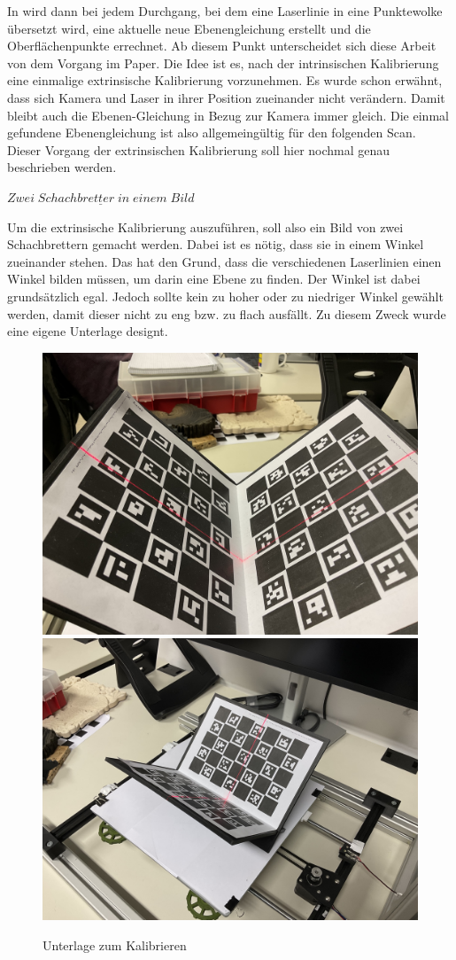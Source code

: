 		In \citep{bajpai_cross-platform_nodate} wird dann bei jedem Durchgang, bei dem eine Laserlinie in eine Punktewolke übersetzt wird, eine aktuelle neue Ebenengleichung erstellt und die Oberflächenpunkte errechnet. Ab diesem Punkt unterscheidet sich diese Arbeit von dem Vorgang im Paper. Die Idee ist es, nach der intrinsischen Kalibrierung eine einmalige extrinsische Kalibrierung vorzunehmen. Es wurde schon erwähnt, dass sich Kamera und Laser in ihrer Position zueinander nicht verändern. Damit bleibt auch die Ebenen-Gleichung in Bezug zur Kamera immer gleich. Die einmal gefundene Ebenengleichung ist also allgemeingültig für den folgenden Scan. Dieser Vorgang der extrinsischen Kalibrierung soll hier nochmal genau beschrieben werden.
		
		$\underline{Zwei \; Schachbretter \; in \; einem \; Bild}$
		
		Um die extrinsische Kalibrierung auszuführen, soll also ein Bild von zwei Schachbrettern gemacht werden. Dabei ist es nötig, dass sie in einem Winkel zueinander stehen. Das hat den Grund, dass die verschiedenen Laserlinien einen Winkel bilden müssen, um darin eine Ebene zu finden. Der Winkel ist dabei grundsätzlich egal. Jedoch sollte kein zu hoher oder zu niedriger Winkel gewählt werden, damit dieser nicht zu eng bzw. zu flach ausfällt. Zu diesem Zweck wurde eine eigene Unterlage designt.
		
		\begin{figure}[h]
			\centering
			\includegraphics[width=0.49\linewidth]{img/hauptteil/ext-calib/pattern_0.jpg}
			\includegraphics[width=0.49\linewidth]{img/hauptteil/ext-calib/pattern_1.jpg}
			\caption{Unterlage zum Kalibrieren}
			\label{fig:ext-calib-pattern}
		\end{figure} 
	
